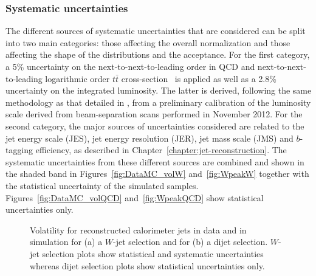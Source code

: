 \subsubsection*{Systematic uncertainties}

The different sources of systematic uncertainties that are considered can be split into two main categories: those affecting the overall normalization and those affecting the shape of the distributions and the acceptance. For the first category, a 5\% uncertainty on the next-to-next-to-leading order in QCD and next-to-next-to-leading logarithmic order $t\bar{t}$ cross-section~\cite{Aliev:2010zk} is applied as well as a 2.8\% uncertainty on the integrated luminosity. The latter is derived, following the same methodology as that detailed in \cite{ATLASLumi}, from a preliminary calibration of the luminosity scale derived from beam-separation scans performed in November 2012. For the second category, the major sources of uncertainties considered are related to the jet energy scale (JES), jet energy resolution (JER), jet mass scale (JMS) and $b$-tagging efficiency, as described in Chapter~\ref{chapter:jet-reconstruction}. The systematic uncertainties from these different sources are combined and shown in the shaded band in Figures~\ref{fig:DataMC_volW} and~\ref{fig:WpeakW} together with the statistical uncertainty of the simulated samples. Figures~\ref{fig:DataMC_volQCD} and~\ref{fig:WpeakQCD} show statistical uncertainties only.

\begin{figure}[htbp]
\centering
\caption{Volatility for reconstructed calorimeter jets in data and in simulation for (a) a $W$-jet selection and for (b) a dijet selection. $W$-jet selection plots show statistical and systematic uncertainties whereas dijet selection plots show statistical uncertainties only.}%
\label{fig:DataMC_vol}
\end{figure}

